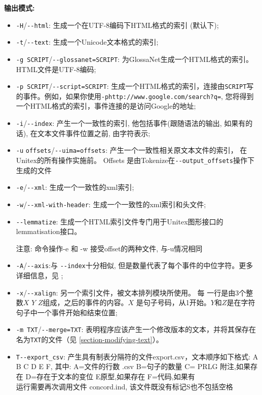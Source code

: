 \bigskip
\noindent \textbf{输出模式:}
\begin{itemize}
  \item \verb+-H+/\verb+--html+: 生成一个在UTF-8编码下HTML格式的索引 (默认下);
  \item \verb+-t+/\verb+--text+: 生成一个Unicode文本格式的索引; 
  \item \verb+-g SCRIPT+/\verb+--glossanet=SCRIPT+: 为GlossaNet生成一个HTML格式的索引。
 HTML文件是UTF-8编码;
  \item \verb+-p SCRIPT+/\verb+--script=SCRIPT+: 生成一个HTML格式的索引，连接由\verb+SCRIPT+写的事件。例如，如果你使用\verb$-phttp://www.google.com/search?q=$, 您将得到一个HTML格式的索引，事件连接的是访问Google的地址;

\item \verb+-i+/\verb+--index+: 产生一个一致性的索引, 他包括事件(跟随语法的输出, 如果有的话), 在文本文件事件位置之前, 由字符表示;
\item \verb+-u+ \verb+offsets+/\verb+--uima=offsets+: 产生一个一致性相关原文本文件的索引，
在Unitex的所有操作实施前。 Offsets 是由Tokenize在\verb+--output_offsets+操作下生成的文件

\item \verb+-e+/\verb+--xml+: 生成一个一致性的xml索引;
\item \verb+-w+/\verb+--xml-with-header+: 生成一个一致性的xml索引和头文件;
\item \verb+--lemmatize+: 生成一个HTML索引文件专门用于Unitex图形接口的lemmatisation接口。



	注意: 命令操作-e 和 -w 接受offset的两种文件, 与-u情况相同
	
\item \verb+-A+/\verb+--axis+:与 \verb+--index+十分相似, 但是数量代表了每个事件的中位字符。更多详细信息，见 \cite{axis};

\item \verb+-x+/\verb+--xalign+: 另一个索引文件，被文本排列模块所使用。 每
一行是由3个整数$X$ $Y$ $Z$组成，之后的事件的内容。$X$
是句子号码，从1开始。$Y$和$Z$是在字符句子中一个事件开始和结束位置;

\item \verb+-m TXT+/\verb+--merge=TXT+: 表明程序应该产生一个修改版本的文本，并将其保存在名为\verb+TXT+的文件（见
 \ref{section-modifying-text}）。
 
\item  \verb+T--export_csv+: 产生具有制表分隔符的文件export.csv，文本顺序如下格式:
	\subitem A B C D E F, 其中:
	\subitem  A=文件的行数 .csv
	\subitem  B=句子的数量
	\subitem  C= PRLG 附注,如果存在
	\subitem  D=存在于文本的变位
	\subitem  E原型,如果存在
	\subitem  F=代码,如果有\\
	运行需要再次调用文件 concord.ind, 该文件既没有标记{S}也不包括空格
\end{itemize}

